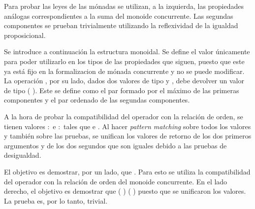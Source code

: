 \begin{AgdaAlign}
Para probar las leyes de las mónadas se utilizan, a la izquierda, las propiedades análogas correspondientes a la suma del monoide concurrente. Las segundas componentes se prueban trivialmente utilizando la reflexividad de la igualdad proposicional. 

Se introduce a continuación la estructura monoidal. Se define el valor  únicamente para poder utilizarlo en los tipos de las propiedades que siguen, puesto que este ya está fijo en la formalizacion de mónada concurrente y no se puede modificar. La operación , por su lado, dados dos valores de tipo   y  , debe devolver un valor de tipo   ( \AgdaDatatype{$\times$} ). Este se define como el par formado por el máximo de las primeras componentes y el par ordenado de las segundas componentes.

A la hora de probar la compatibilidad del operador  con la relación de orden, se tienen valores  $:$   e  $:$   tales que    e   . Al hacer \textit{pattern matching} sobre todos los valores y también sobre las pruebas, se unifican los valores de retorno de los dos primeros argumentos y de los dos segundos que son iguales debido a las pruebas de desigualdad. 

El objetivo es demostrar, por un lado, que   \AgdaField{$\lesssim$}  . Para esto se utiliza la compatibilidad del operador  con la relación de orden del monoide concurrente. En el lado derecho, el objetivo es demostrar que ( \AgdaInductiveConstructor{,} ) \AgdaFunction{$\equiv$} ( \AgdaInductiveConstructor{,} ) puesto que se unificaron los valores. La prueba es, por lo tanto, trivial. 


\end{AgdaAlign}
